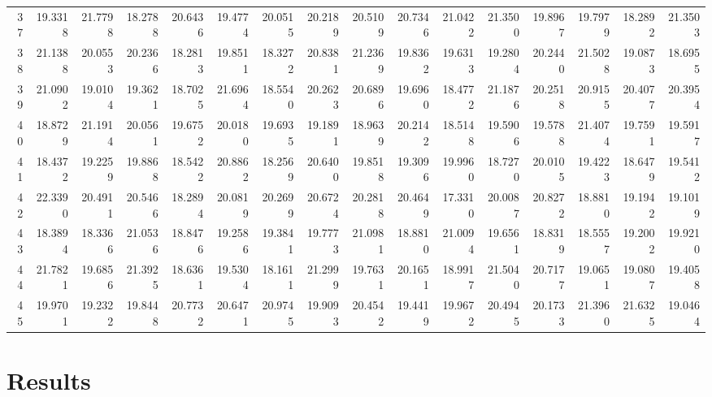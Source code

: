 \documentclass[12pt]{article}\usepackage[]{graphicx}\usepackage[]{color}
\begin{document}
\begin{landscape}
\begin{longtable}[t]{rrrrrrrrrrrrrrrr}
37 & 19.3318 & 21.7798 & 18.2788 & 20.6436 & 19.4774 & 20.0515 & 20.2189 & 20.5109 & 20.7346 & 21.0422 & 21.3500 & 19.8967 & 19.7979 & 18.2892 & 21.3503\\
38 & 21.1388 & 20.0553 & 20.2366 & 18.2813 & 19.8511 & 18.3272 & 20.8381 & 21.2369 & 19.8362 & 19.6313 & 19.2804 & 20.2440 & 21.5028 & 19.0873 & 18.6955\\
39 & 21.0902 & 19.0104 & 19.3621 & 18.7025 & 21.6964 & 18.5540 & 20.2623 & 20.6896 & 19.6960 & 18.4772 & 21.1876 & 20.2518 & 20.9155 & 20.4077 & 20.3954\\
40 & 18.8729 & 21.1914 & 20.0561 & 19.6752 & 20.0180 & 19.6935 & 19.1891 & 18.9639 & 20.2142 & 18.5148 & 19.5906 & 19.5788 & 21.4074 & 19.7591 & 19.5917\\
41 & 18.4372 & 19.2259 & 19.8868 & 18.5422 & 20.8862 & 18.2569 & 20.6400 & 19.8518 & 19.3096 & 19.9960 & 18.7270 & 20.0105 & 19.4223 & 18.6479 & 19.5412\\
42 & 22.3390 & 20.4911 & 20.5466 & 18.2894 & 20.0819 & 20.2699 & 20.6724 & 20.2818 & 20.4649 & 17.3310 & 20.0087 & 20.8272 & 18.8810 & 19.1942 & 19.1019\\
43 & 18.3894 & 18.3366 & 21.0536 & 18.8476 & 19.2586 & 19.3841 & 19.7773 & 21.0981 & 18.8810 & 21.0094 & 19.6561 & 18.8319 & 18.5557 & 19.2002 & 19.9210\\
44 & 21.7821 & 19.6856 & 21.3925 & 18.6361 & 19.5304 & 18.1611 & 21.2999 & 19.7631 & 20.1651 & 18.9917 & 21.5040 & 20.7177 & 19.0651 & 19.0807 & 19.4058\\
45 & 19.9701 & 19.2322 & 19.8448 & 20.7732 & 20.6471 & 20.9745 & 19.9093 & 20.4542 & 19.4419 & 19.9672 & 20.4945 & 20.1733 & 21.3960 & 21.6325 & 19.0464\\*
\end{longtable}
\end{landscape}
\endgroup{}

\clearpage

\hypertarget{results}{%
\section{Results}\label{results}}
\end{document}
